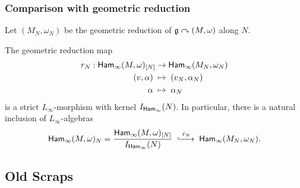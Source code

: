 \documentclass[handout,10pt]{beamer}
\begin{document}
\begin{frame}\frametitle{Comparison with geometric reduction}

	Let $(M_N,\omega_N)$ be the geometric reduction of $\mathfrak{g}\curvearrowright(M,\omega)$ along $N$.

	\vspace{5pt}
	\begin{theorem}
		The geometric reduction map
		\begin{align*}
			r_N:	\mathsf{Ham}_\infty(M,\omega)_{[N]}	&\to		\mathsf{Ham}_\infty(M_N,\omega_N)		\\
			(v,\alpha)\;			&\mapsto	\;(v_N,\alpha_N)			\\
			\alpha\;			&\mapsto	\;\alpha_N
		\end{align*}
		is a strict $L_\infty$-morphism with kernel $I_{\mathsf{Ham}_\infty}(N)$. In particular, there is a natural inclusion of $L_\infty$-algebras
		\[
		\mathsf{Ham}_\infty(M,\omega)_N = \frac{\mathsf{Ham}_\infty(M,\omega)_{[N]}}{I_{\mathsf{Ham}_\infty}(N)} \;\xhookrightarrow{\;\bar{r}_N\;}\; \mathsf{Ham}_\infty(M_N,\omega_N).
		\]
	\end{theorem}
\end{frame}



\subsection{Old Scraps}
\end{document}
